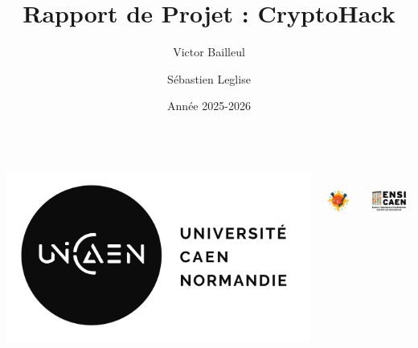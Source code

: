 \documentclass{beamer}
\title{Rapport de Projet : CryptoHack}
\author{Victor Bailleul \and Sébastien Leglise}
\institute{Université de Caen Normandie / ENSICAEN}
\date{Année 2025-2026}
\begin{document}
    \begin{frame}[plain] %
        \titlepage

        \vfill

        \begin{columns}[T, totalwidth=\textwidth]
            \begin{column}{0.33\textwidth}
                \centering %
                \includegraphics[height=2.cm]{../Main/Images/Others/logo_unicaen.png}
            \end{column}
            \begin{column}{0.33\textwidth}
                \centering
                \includegraphics[height=2cm]{../Main/Images/Others/logo_cryptohack.png}
            \end{column}
            \begin{column}{0.33\textwidth}
                \centering
                \includegraphics[height=2cm]{../Main/Images/Others/logo_ensicaen.png}
            \end{column}
        \end{columns}

        \vspace{0.2cm}
    \end{frame}
\end{document}
